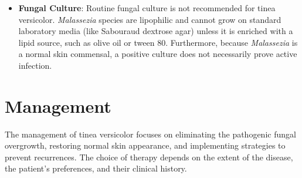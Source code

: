 \begin{itemize}
    \item \textbf{Fungal Culture}: Routine fungal culture is not recommended for tinea versicolor. \textit{Malassezia} species are lipophilic and cannot grow on standard laboratory media (like Sabouraud dextrose agar) unless it is enriched with a lipid source, such as olive oil or tween 80. Furthermore, because \textit{Malassezia} is a normal skin commensal, a positive culture does not necessarily prove active infection.
\end{itemize}

\section*{Management}
The management of tinea versicolor focuses on eliminating the pathogenic fungal overgrowth, restoring normal skin appearance, and implementing strategies to prevent recurrences. The choice of therapy depends on the extent of the disease, the patient's preferences, and their clinical history.

